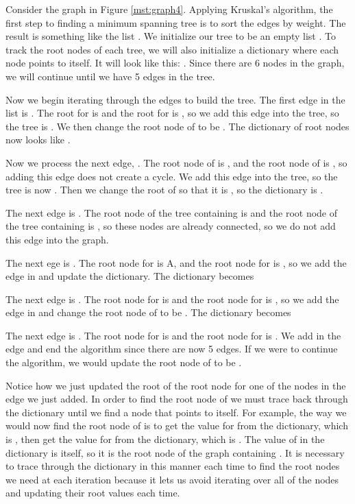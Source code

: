 Consider the graph in Figure \ref{mst:graph4}.
Applying Kruskal's algorithm, the first step to finding a minimum spanning tree is to sort the edges by weight.
The result is something like the list \li{[(C, D, 1), (C, E, 1), (D, E, 2), (A, B, 3), (B, F, 4), (E, F, 4), (B, C, 5), (C, F, 5), (A, F, 6)]}.
We initialize our tree to be an empty list \li{[]}.
To track the root nodes of each tree, we will also initialize a dictionary where each node points to itself.
It will look like this: .
Since there are 6 nodes in the graph, we will continue until we have 5 edges in the tree.

Now we begin iterating through the edges to build the tree.
The first edge in the list is .
The root for  is  and the root for  is , so we add this edge into the tree, so the tree is \li{[(C, D, 1)]}.
We then change the root node of  to be .
The dictionary of root nodes now looks like .

Now we process the next edge, .
The root node of  is , and the root node of  is , so adding this edge does not create a cycle.
We add this edge into the tree, so the tree is now \li{[(C, D, 1), (C, E, 1)]}.
Then we change the root of  so that it is , so the dictionary is .

The next edge is .
The root node of the tree containing  is  and the root node of the tree containing  is , so these nodes are already connected, so we do not add this edge into the graph.

The next ege is .
The root node for  is A, and the root node for  is , so we add the edge in and update the dictionary.
The dictionary becomes 

The next edge is .
The root node for  is  and the root node for  is , so we add the edge in and change the root node of  to be .
The dictionary becomes 

The next edge is .
The root node for  is  and the root node for  is .
We add in the edge and end the algorithm since there are now 5 edges.
If we were to continue the algorithm, we would update the root node of  to be .

Notice how we just updated the root of the root node for one of the nodes in the edge we just added.
In order to find the root node of  we must trace back through the dictionary until we find a node that points to itself.
For example, the way we would now find the root node of  is to get the value for  from the dictionary, which is , then get the value for  from the dictionary, which is .
The value of  in the dictionary is itself, so it is the root node of the graph containing .
It is necessary to trace through the dictionary in this manner each time to find the root nodes we need at each iteration because it lets us avoid iterating over all of the nodes and updating their root values each time.

